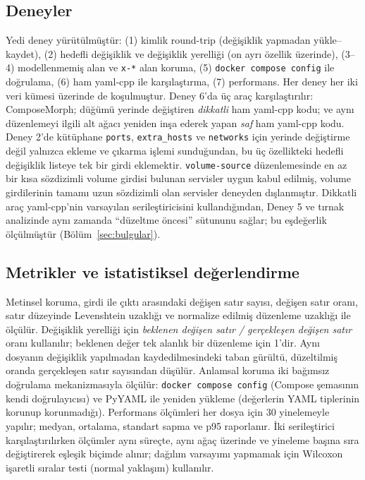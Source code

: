 \documentclass[12pt,a4paper]{article}
\begin{document}
\subsection{Deneyler}
Yedi deney yürütülmüştür: (1) kimlik round-trip (değişiklik yapmadan
yükle--kaydet), (2) hedefli değişiklik ve değişiklik yerelliği (on ayrı
özellik üzerinde), (3--4) modellenmemiş alan ve \texttt{x-*} alan
koruma, (5) \texttt{docker compose config} ile doğrulama, (6) ham yaml-cpp
ile karşılaştırma, (7) performans. Her deney her iki veri kümesi üzerinde
de koşulmuştur. Deney 6'da üç araç karşılaştırılır: ComposeMorph; düğümü
yerinde değiştiren \emph{dikkatli} ham yaml-cpp kodu; ve aynı düzenlemeyi
ilgili alt ağacı yeniden inşa ederek yapan \emph{saf} ham yaml-cpp kodu.
Deney 2'de kütüphane \texttt{ports}, \texttt{extra\_hosts} ve
\texttt{networks} için yerinde değiştirme değil yalnızca ekleme ve çıkarma
işlemi sunduğundan, bu üç özellikteki hedefli değişiklik listeye tek bir
girdi eklemektir. \texttt{volume-source} düzenlemesinde en az bir kısa
sözdizimli volume girdisi bulunan servisler uygun kabul edilmiş, volume
girdilerinin tamamı uzun sözdizimli olan servisler deneyden dışlanmıştır.
Dikkatli araç yaml-cpp'nin varsayılan serileştiricisini kullandığından,
Deney 5 ve tırnak analizinde aynı zamanda ``düzeltme öncesi'' sütununu
sağlar; bu eşdeğerlik ölçülmüştür (Bölüm~\ref{sec:bulgular}).

\subsection{Metrikler ve istatistiksel değerlendirme}
Metinsel koruma, girdi ile çıktı arasındaki değişen satır sayısı, değişen
satır oranı, satır düzeyinde Levenshtein uzaklığı ve normalize edilmiş
düzenleme uzaklığı ile ölçülür. Değişiklik yerelliği için
\emph{beklenen değişen satır / gerçekleşen değişen satır} oranı kullanılır;
beklenen değer tek alanlık bir düzenleme için 1'dir. Aynı dosyanın
değişiklik yapılmadan kaydedilmesindeki taban gürültü, düzeltilmiş oranda
gerçekleşen satır sayısından düşülür. Anlamsal koruma iki bağımsız
doğrulama mekanizmasıyla ölçülür: \texttt{docker compose config} (Compose şemasının
kendi doğrulayıcısı) ve PyYAML ile yeniden yükleme (değerlerin YAML
tiplerinin korunup korunmadığı). Performans ölçümleri her dosya için 30
yinelemeyle yapılır; medyan, ortalama, standart sapma ve p95 raporlanır.
İki serileştirici karşılaştırılırken ölçümler aynı süreçte, aynı ağaç
üzerinde ve yineleme başına sıra değiştirerek eşleşik biçimde alınır;
dağılım varsayımı yapmamak için Wilcoxon işaretli sıralar testi (normal
yaklaşım) kullanılır.
\end{document}
